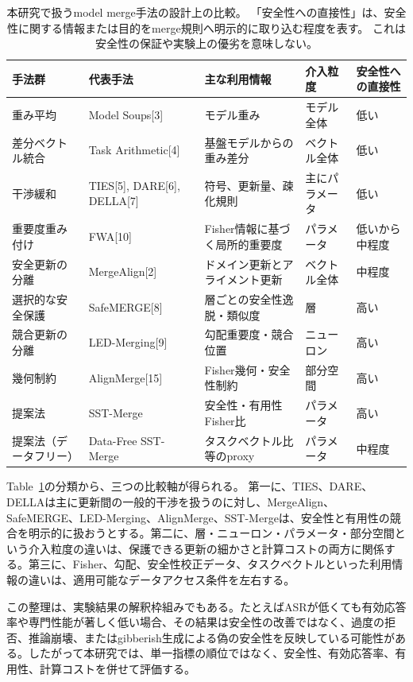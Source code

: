 \documentclass{article}
\begin{document}
\begin{table}[t]
\centering
\caption{本研究で扱うmodel merge手法の設計上の比較。
「安全性への直接性」は、安全性に関する情報または目的をmerge規則へ明示的に取り込む程度を表す。
これは安全性の保証や実験上の優劣を意味しない。}
\label{tab:method-comparison-revised}
\small
\begin{tabular}{p{2.3cm}p{2.7cm}p{3.0cm}p{2.0cm}p{2.6cm}}
\toprule
手法群 & 代表手法 & 主な利用情報 & 介入粒度 & 安全性への直接性 \\
\midrule
重み平均 &
Model Soups[3] &
モデル重み &
モデル全体 &
低い \\
差分ベクトル統合 &
Task Arithmetic[4] &
基盤モデルからの重み差分 &
ベクトル全体 &
低い \\
干渉緩和 &
TIES[5], DARE[6], DELLA[7] &
符号、更新量、疎化規則 &
主にパラメータ &
低い \\
重要度重み付け &
FWA[10] &
Fisher情報に基づく局所的重要度 &
パラメータ &
低いから中程度 \\
安全更新の分離 &
MergeAlign[2] &
ドメイン更新とアライメント更新 &
ベクトル全体 &
中程度 \\
選択的な安全保護 &
SafeMERGE[8] &
層ごとの安全性逸脱・類似度 &
層 &
高い \\
競合更新の分離 &
LED-Merging[9] &
勾配重要度・競合位置 &
ニューロン &
高い \\
幾何制約 &
AlignMerge[15] &
Fisher幾何・安全性制約 &
部分空間 &
高い \\
提案法 &
SST-Merge &
安全性・有用性Fisher比 &
パラメータ &
高い \\
提案法（データフリー） &
Data-Free SST-Merge &
タスクベクトル比等のproxy &
パラメータ &
中程度 \\
\bottomrule
\end{tabular}
\end{table}

Table~\ref{tab:method-comparison-revised}の分類から、三つの比較軸が得られる。
第一に、TIES、DARE、DELLAは主に更新間の一般的干渉を扱うのに対し、MergeAlign、SafeMERGE、LED-Merging、AlignMerge、SST-Mergeは、安全性と有用性の競合を明示的に扱おうとする。第二に、層・ニューロン・パラメータ・部分空間という介入粒度の違いは、保護できる更新の細かさと計算コストの両方に関係する。第三に、Fisher、勾配、安全性校正データ、タスクベクトルといった利用情報の違いは、適用可能なデータアクセス条件を左右する。

この整理は、実験結果の解釈枠組みでもある。たとえばASRが低くても有効応答率や専門性能が著しく低い場合、その結果は安全性の改善ではなく、過度の拒否、推論崩壊、またはgibberish生成による偽の安全性を反映している可能性がある。したがって本研究では、単一指標の順位ではなく、安全性、有効応答率、有用性、計算コストを併せて評価する。
\end{document}
